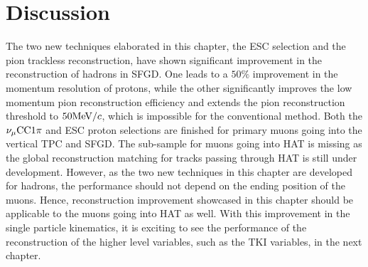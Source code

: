      \section{Discussion}
     \label{sec:technique-disc}
          The two new techniques elaborated in this chapter, the ESC selection and the pion trackless reconstruction, have shown significant improvement in the reconstruction of hadrons in SFGD.
          One leads to a $50\%$ improvement in the momentum resolution of protons, while the other significantly improves the low momentum pion reconstruction efficiency and extends the pion reconstruction threshold to $50\textrm{MeV}/c$, which is impossible for the conventional method.
          Both the $\nu_{\mu}\textrm{CC}1\pi$ and ESC proton selections are finished for primary muons going into the vertical TPC and SFGD. 
          The sub-sample for muons going into HAT is missing as the global reconstruction matching for tracks passing through HAT is still under development.
          However, as the two new techniques in this chapter are developed for hadrons, the performance should not depend on the ending position of the muons.
          Hence, reconstruction improvement showcased in this chapter should be applicable to the muons going into HAT as well.
          With this improvement in the single particle kinematics, it is exciting to see the performance of the reconstruction of the higher level variables, such as the TKI variables, in the next chapter.


          